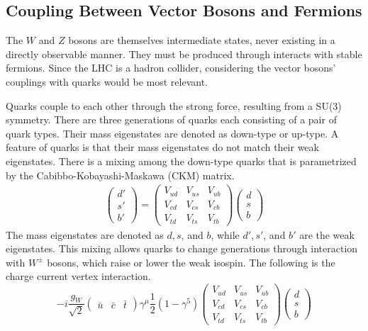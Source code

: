 \subsection{Coupling Between Vector Bosons and Fermions} \label{sec:produce-vector}

The $W$ and $Z$ bosons are themselves intermediate states,
never existing in a directly observable manner.
They must be produced through interacts with stable fermions.
Since the LHC is a hadron collider,
considering the vector bosons' couplings with quarks would be most relevant.

Quarks couple to each other through the strong force,
resulting from a SU(3) symmetry.
There are three generations of quarks each consisting of a pair of quark types.
Their mass eigenstates are denoted as down-type or up-type.
A feature of quarks is that their mass eigenstates do not match their weak eigenstates.
There is a mixing among the down-type quarks that is parametrized by the
Cabibbo-Kobayashi-Maskawa (CKM) matrix.
\begin{gather}
  \left(
  \begin{matrix}
    d' \\
    s' \\
    b'
  \end{matrix}
  \right)
  =
  \left(
  \begin{matrix}
    V_{ud} & V_{us} & V_{ub} \\
    V_{cd} & V_{cs} & V_{cb} \\
    V_{td} & V_{ts} & V_{tb}
  \end{matrix}
  \right)
  \left(
  \begin{matrix}
    d \\
    s \\
    b
  \end{matrix}
  \right) \label{eq:ckm}
\end{gather}
The mass eigenstates are denoted as $d, s$, and $b$,
while $d', s'$, and $b'$ are the weak eigenstates.
This mixing allows quarks to change generations through interaction with $W^\pm$ bosons,
which raise or lower the weak isospin.
The following is the charge current vertex interaction.
\[
-i \frac{g_W}{\sqrt{2}}
\left(
\begin{matrix}
\bar{u} & \bar{c} & \bar{t}
\end{matrix}
\right)
\gamma^\mu \frac12 (1 - \gamma^5)
\left(
\begin{matrix}
  V_{ud} & V_{us} & V_{ub} \\
  V_{cd} & V_{cs} & V_{cb} \\
  V_{td} & V_{ts} & V_{tb}
\end{matrix}
\right)
\left(
\begin{matrix}
d \\ s \\ b
\end{matrix}
\right)
\]
